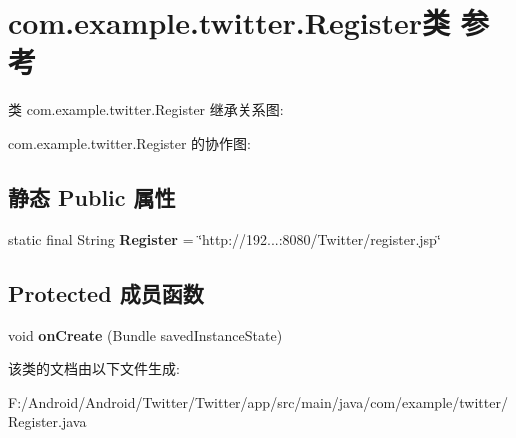 \hypertarget{classcom_1_1example_1_1twitter_1_1_register}{}\section{com.\+example.\+twitter.\+Register类 参考}
\label{classcom_1_1example_1_1twitter_1_1_register}


类 com.\+example.\+twitter.\+Register 继承关系图\+:


com.\+example.\+twitter.\+Register 的协作图\+:
\subsection*{静态 Public 属性}
\begin{DoxyCompactItemize}
\item 
\mbox{\label{classcom_1_1example_1_1twitter_1_1_register_a3917e7aebc181fa90d4976545e332986}} 
static final String {\bfseries Register} = \char`\"{}http\+://192...\+:8080/Twitter/register.\+jsp\char`\"{}
\end{DoxyCompactItemize}
\subsection*{Protected 成员函数}
\begin{DoxyCompactItemize}
\item 
\mbox{\label{classcom_1_1example_1_1twitter_1_1_register_a5c4ae8b20c0d33a01db0dd4d0f1ee48f}} 
void {\bfseries on\+Create} (Bundle saved\+Instance\+State)
\end{DoxyCompactItemize}


该类的文档由以下文件生成\+:\begin{DoxyCompactItemize}
\item 
F\+:/\+Android/\+Android/\+Twitter/\+Twitter/app/src/main/java/com/example/twitter/Register.\+java\end{DoxyCompactItemize}
